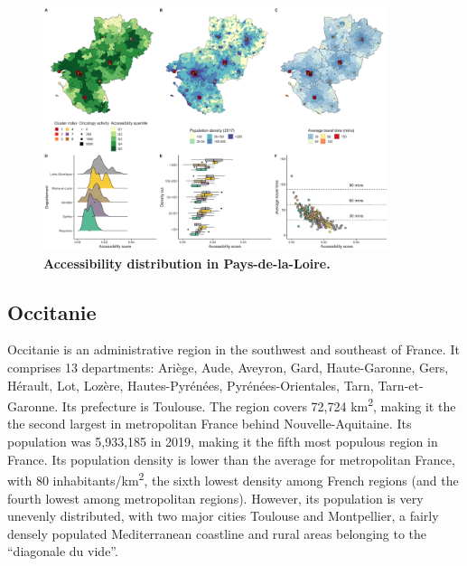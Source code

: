 \begin{figure}[H]
    \includegraphics[width=0.9\textwidth]{images/camion/region_accessibility/accessibility_Pays-de-la-Loire.png}
    \centering
    \caption{
        \textbf{Accessibility distribution in Pays-de-la-Loire.}
    }
\end{figure}

\subsection*{Occitanie}

Occitanie is an administrative region in the southwest and southeast of France. It comprises 13 departments: Ariège, Aude, Aveyron, Gard, Haute-Garonne, Gers, Hérault, Lot, Lozère, Hautes-Pyrénées, Pyrénées-Orientales, Tarn, Tarn-et-Garonne. Its prefecture is Toulouse. The region covers 72,724 km\textsuperscript{2}, making it the the second largest in metropolitan France behind Nouvelle-Aquitaine. Its population was 5,933,185 in 2019, making it the fifth most populous region in France. Its population density is lower than the average for metropolitan France, with 80 inhabitants/km\textsuperscript{2}, the sixth lowest density among French regions (and the fourth lowest among metropolitan regions). However, its population is very unevenly distributed, with two major cities Toulouse and Montpellier, a fairly densely populated Mediterranean coastline and rural areas belonging to the ``diagonale du vide''.

